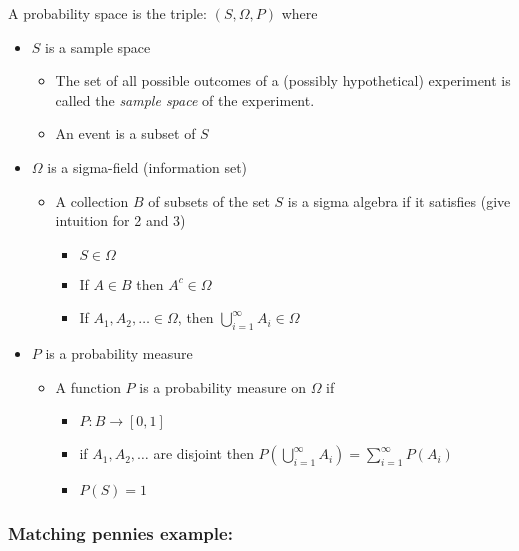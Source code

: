 \documentclass[11pt]{article}
\begin{document}
     A probability space is the triple: $(S, \Omega, P)$ where
\begin{itemize}
\item $S$ is a sample space
\begin{itemize}
\item The set of all possible outcomes of a (possibly hypothetical)
         experiment is called the \emph{sample space} of the experiment.
\item An event is a subset of $S$
\end{itemize}
\item $\Omega$ is a sigma-field (information set)
\begin{itemize}
\item A collection $B$ of subsets of the set $S$ is a sigma
         algebra if it satisfies (give intuition for 2 and 3)
\begin{itemize}
\item $S \in  \Omega$
\item If $A \in  B$ then $A^c \in  \Omega$
\item If $A_1, A_2, \dots \in  \Omega$, then $\bigcup_{i=1}^\infty A_i
           \in  \Omega$
\end{itemize}
\end{itemize}
\item $P$ is a probability measure
\begin{itemize}
\item A function $P$ is a probability measure on $\Omega$ if
\begin{itemize}
\item $P:  B \to [0,1]$
\item if $A_1,A_2,\dots$ are disjoint then $P(\bigcup_{i=1}^\infty
           A_i) = \sum_{i=1}^\infty P(A_i)$
\item $P(S) = 1$
\end{itemize}
\end{itemize}
\end{itemize}
\subsubsection{Matching pennies example:}
\label{sec-1-2-1}
\end{document}
